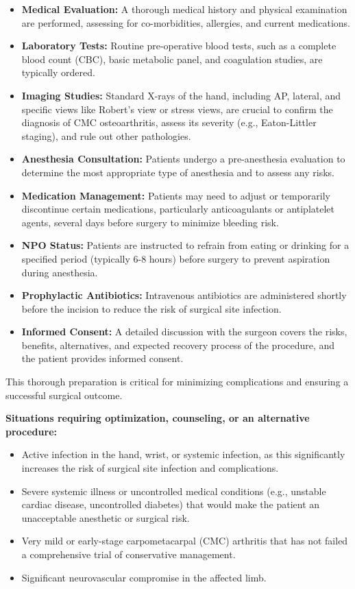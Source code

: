 \begin{itemize}
  \item \textbf{Medical Evaluation:} A thorough medical history and physical examination are performed, assessing for co-morbidities, allergies, and current medications.
  \item \textbf{Laboratory Tests:} Routine pre-operative blood tests, such as a complete blood count (CBC), basic metabolic panel, and coagulation studies, are typically ordered.
  \item \textbf{Imaging Studies:} Standard X-rays of the hand, including AP, lateral, and specific views like Robert's view or stress views, are crucial to confirm the diagnosis of CMC osteoarthritis, assess its severity (e.g., Eaton-Littler staging), and rule out other pathologies.
  \item \textbf{Anesthesia Consultation:} Patients undergo a pre-anesthesia evaluation to determine the most appropriate type of anesthesia and to assess any risks.
  \item \textbf{Medication Management:} Patients may need to adjust or temporarily discontinue certain medications, particularly anticoagulants or antiplatelet agents, several days before surgery to minimize bleeding risk.
  \item \textbf{NPO Status:} Patients are instructed to refrain from eating or drinking for a specified period (typically 6-8 hours) before surgery to prevent aspiration during anesthesia.
  \item \textbf{Prophylactic Antibiotics:} Intravenous antibiotics are administered shortly before the incision to reduce the risk of surgical site infection.
  \item \textbf{Informed Consent:} A detailed discussion with the surgeon covers the risks, benefits, alternatives, and expected recovery process of the procedure, and the patient provides informed consent.
\end{itemize}

This thorough preparation is critical for minimizing complications and ensuring a successful surgical outcome.

\textbf{Situations requiring optimization, counseling, or an alternative procedure:}
\begin{itemize}
  \item Active infection in the hand, wrist, or systemic infection, as this significantly increases the risk of surgical site infection and complications.
  \item Severe systemic illness or uncontrolled medical conditions (e.g., unstable cardiac disease, uncontrolled diabetes) that would make the patient an unacceptable anesthetic or surgical risk.
  \item Very mild or early-stage carpometacarpal (CMC) arthritis that has not failed a comprehensive trial of conservative management.
  \item Significant neurovascular compromise in the affected limb.
\end{itemize}

